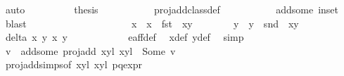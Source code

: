 \begin{isabellebody}
\ auto\isanewline
\ \ \ \ \ \ \isamarkupfalse%
\ \isamarkupfalse%
\ {\isacharquery}thesis\ \isanewline
\ \ \ \ \ \ \ \ \isamarkupfalse%
\ proj{\isacharunderscore}add{\isacharunderscore}class{\isacharunderscore}def\ \isanewline
\ \ \ \ \ \ \ \ \isamarkupfalse%
\ add{\isacharunderscore}some\ in{\isacharunderscore}set\ \isamarkupfalse%
\ blast\isanewline
\ \ \ \ \isamarkupfalse%
\isanewline
\ \ \ \ \ \ \isamarkupfalse%
\ {}\isanewline
\ \ \ \ \ \ \isamarkupfalse%
\ x{\isacharprime}{\isacharprime}\ \ {\isachardoublequoteopen}x{\isacharprime}{\isacharprime}\ {\isacharequal}\ fst\ {\isacharparenleft}{\isasymtau}\ {\isacharparenleft}x{\isacharprime}{\isacharcomma}y{\isacharprime}{\isacharparenright}{\isacharparenright}{\isachardoublequoteclose}\isanewline
\ \ \ \ \ \ \isamarkupfalse%
\ y{\isacharprime}{\isacharprime}\ \ {\isachardoublequoteopen}y{\isacharprime}{\isacharprime}\ {\isacharequal}\ snd\ {\isacharparenleft}{\isasymtau}\ {\isacharparenleft}x{\isacharprime}{\isacharcomma}y{\isacharprime}{\isacharparenright}{\isacharparenright}{\isachardoublequoteclose}\isanewline
\ \ \ \ \ \ \isamarkupfalse%
\ {}\ \isamarkupfalse%
\ {\isachardoublequoteopen}delta{\isacharprime}\ x\ y\ x{\isacharprime}{\isacharprime}\ y{\isacharprime}{\isacharprime}\ {\isasymnoteq}\ {}{\isachardoublequoteclose}\isanewline
\ \ \ \ \ \ \ \ \isamarkupfalse%
\ e{\isacharunderscore}aff{\isacharunderscore}{}{\isacharunderscore}def\ \isamarkupfalse%
\ x{\isacharprime}{\isacharprime}{\isacharunderscore}def\ y{\isacharprime}{\isacharprime}{\isacharunderscore}def\ \isamarkupfalse%
\ simp\ \isanewline
\ \ \ \ \ \ \isamarkupfalse%
\ \isamarkupfalse%
\ v\ \ add{\isacharunderscore}some{\isacharcolon}\ {\isachardoublequoteopen}proj{\isacharunderscore}add\ {\isacharparenleft}{\isacharparenleft}x{\isacharcomma}y{\isacharparenright}{\isacharcomma}l{\isacharparenright}\ {\isacharparenleft}{\isacharparenleft}x{\isacharprime}{\isacharprime}{\isacharcomma}y{\isacharprime}{\isacharprime}{\isacharparenright}{\isacharcomma}l{\isacharprime}{\isacharplus}{}{\isacharparenright}\ {\isacharequal}\ Some\ v{\isachardoublequoteclose}\isanewline
\ \ \ \ \ \ \ \ \isamarkupfalse%
\ proj{\isacharunderscore}add{\isachardot}simps{\isacharbrackleft}of\ {\isachardoublequoteopen}{\isacharparenleft}{\isacharparenleft}x{\isacharcomma}y{\isacharparenright}{\isacharcomma}l{\isacharparenright}{\isachardoublequoteclose}\ {\isachardoublequoteopen}{\isacharparenleft}{\isacharparenleft}x{\isacharprime}{\isacharprime}{\isacharcomma}y{\isacharprime}{\isacharprime}{\isacharparenright}{\isacharcomma}l{\isacharprime}{\isacharplus}{}{\isacharparenright}{\isachardoublequoteclose}{\isacharbrackright}\ p{\isacharunderscore}q{\isacharunderscore}expr\isanewline

\end{isabellebody}
